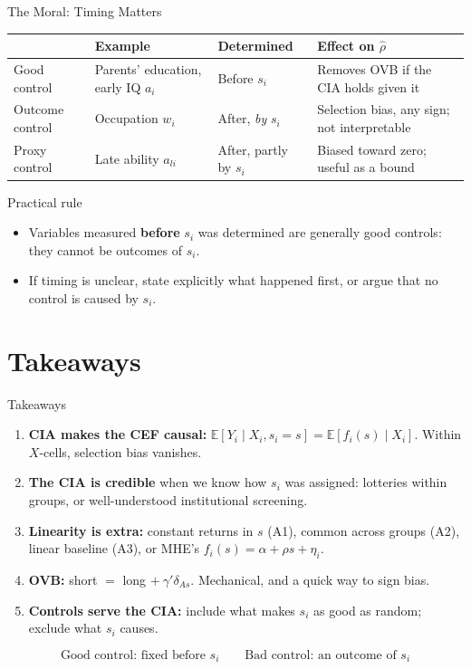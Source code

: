 \documentclass[aspectratio=169,11pt]{beamer}
\newcommand{\E}{\mathbb{E}}
\begin{document}
\begin{frame}{The Moral: Timing Matters}
\small
\renewcommand{\arraystretch}{1.3}
\begin{tabular}{@{}L{2.7cm}L{3.4cm}L{3.3cm}L{3.6cm}@{}}
\toprule
& \textbf{Example} & \textbf{Determined} & \textbf{Effect on $\hat\rho$}\\
\midrule
Good control & Parents' education, early IQ $a_i$ & Before $s_i$ & Removes OVB if the CIA holds given it\\
Outcome control & Occupation $w_i$ & After, \emph{by} $s_i$ & Selection bias, any sign; not interpretable\\
Proxy control & Late ability $a_{li}$ & After, partly by $s_i$ & Biased toward zero; useful as a bound\\
\bottomrule
\end{tabular}
\medskip
\begin{block}{Practical rule}
\begin{itemize}
\item Variables measured \textbf{before} $s_i$ was determined are generally good controls: they cannot be outcomes of $s_i$.
\item If timing is unclear, state explicitly what happened first, or argue that no control is caused by $s_i$.
\end{itemize}
\end{block}
\end{frame}

\section{Takeaways}
\begin{frame}{Takeaways}
\small
\begin{enumerate}
\setlength{\itemsep}{0.7em}
\item \textbf{CIA makes the CEF causal:} $\E[Y_i\mid X_i,s_i=s]=\E[f_i(s)\mid X_i]$. Within $X$-cells, selection bias vanishes.
\item \textbf{The CIA is credible} when we know how $s_i$ was assigned: lotteries within groups, or well-understood institutional screening.
\item \textbf{Linearity is extra:} constant returns in $s$ (A1), common across groups (A2), linear baseline (A3), or MHE's $f_i(s)=\alpha+\rho s+\eta_i$.
\item \textbf{OVB:} short $=$ long $+\ \gamma'\delta_{As}$. Mechanical, and a quick way to sign bias.
\item \textbf{Controls serve the CIA:} include what makes $s_i$ as good as random; \alert{exclude} what $s_i$ causes.
\end{enumerate}
\medskip
\[
\boxed{\text{Good control: fixed before } s_i\qquad\text{Bad control: an outcome of } s_i}
\]
\end{frame}
\end{document}
